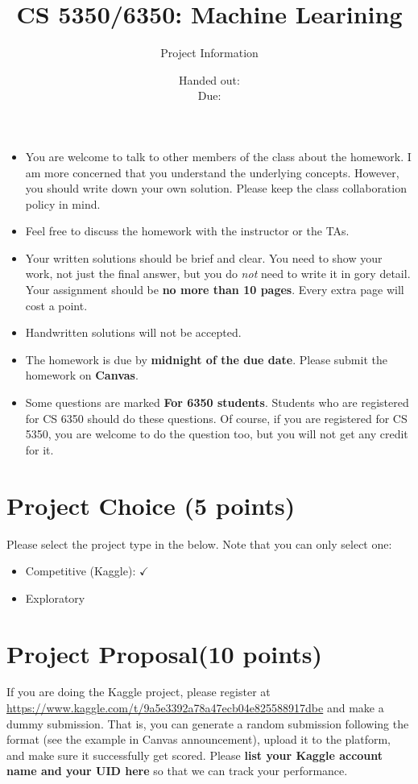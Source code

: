 \documentclass[12pt, fullpage,letterpaper]{article}
\title{CS 5350/6350: Machine Learining \semester}
\author{Project Information}
\date{Handed out: \releaseDate\\
  Due: \dueDate}
\begin{document}
\maketitle


\footnotesize
	\begin{itemize}
		\item You are welcome to talk to other members of the class about
		the homework. I am more concerned that you understand the
		underlying concepts. However, you should write down your own
		solution. Please keep the class collaboration policy in mind.
		
		\item Feel free to discuss the homework with the instructor or the TAs.
		
		\item Your written solutions should be brief and clear. You need to
		show your work, not just the final answer, but you do \emph{not}
		need to write it in gory detail. Your assignment should be {\bf no
			more than 10 pages}. Every extra page will cost a point.
		
		\item Handwritten solutions will not be accepted.
		
		\item The homework is due by \textbf{midnight of the due date}. Please submit
		the homework on \textbf{Canvas}.
		
		\item Some questions are marked {\bf For 6350 students}. Students
		who are registered for CS 6350 should do these questions. Of
		course, if you are registered for CS 5350, you are welcome to do
		the question too, but you will not get any credit for it.
		
	\end{itemize}



\section*{Project Choice (5 points)}

Please select the project type in the below. Note that you can only select one:
\begin{itemize}
	\item Competitive (Kaggle): $\checkmark$
	\item Exploratory
\end{itemize}


\section*{Project Proposal(10 points)} 
If you are doing the Kaggle project, please register at \url{https://www.kaggle.com/t/9a5e3392a78a47ecb04e825588917dbe}  and make a dummy submission. That is, you can generate a random submission following the format (see the example in Canvas announcement), upload it to the platform, and make sure it successfully get scored. Please \textbf{list your Kaggle account name and your UID here} so that we can track your performance. 
\end{document}

